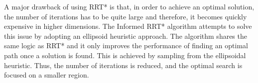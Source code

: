 A major drawback of using RRT* is that, in order to achieve an optimal solution, the number of iterations has to be quite large and therefore, it becomes quickly expensive in higher dimensions. The Informed RRT* \cite{karaman2011sampling} algorithm attempts to solve this issue by adopting an ellipsoid heuristic approach. The algorithm shares the same logic as RRT* and it only improves the performance of finding an optimal path once a solution is found. This is achieved by sampling from the ellipsoidal heuristic. Thus, the number of iterations is reduced, and the optimal search is focused on a smaller region.





